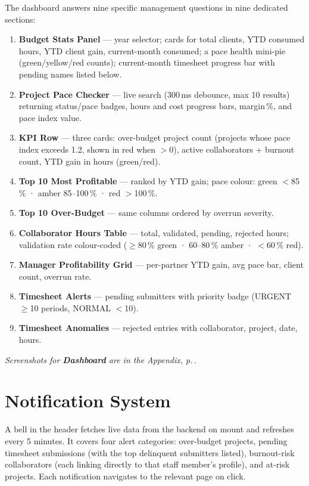 \documentclass[12pt,a4paper]{report}
\newcommand{\annexref}[1]{\begin{screenshotbox}\small\textit{Screenshots for \textbf{#1} are in the Appendix, p.\,\pageref{annex:#1}.}\end{screenshotbox}\vspace{4pt}}
\begin{document}
The dashboard answers nine specific management questions in nine dedicated sections:

\begin{enumerate}[leftmargin=*, label=\arabic*.]
  \item \textbf{Budget Stats Panel} --- year selector; cards for total clients, YTD consumed hours, YTD client gain, current-month consumed; a pace health mini-pie (green/yellow/red counts); current-month timesheet progress bar with pending names listed below.
  \item \textbf{Project Pace Checker} --- live search (300\,ms debounce, max 10 results) returning status/pace badges, hours and cost progress bars, margin\,\%, and pace index value.
  \item \textbf{KPI Row} --- three cards: over-budget project count (projects whose pace index exceeds 1.2, shown in red when $>$0), active collaborators + burnout count, YTD gain in hours (green/red).
  \item \textbf{Top 10 Most Profitable} --- ranked by YTD gain; pace colour: green $<$85\,\% · amber 85--100\,\% · red $>$100\,\%.
  \item \textbf{Top 10 Over-Budget} --- same columns ordered by overrun severity.
  \item \textbf{Collaborator Hours Table} --- total, validated, pending, rejected hours; validation rate colour-coded ($\geq$80\,\% green · 60--80\,\% amber · $<$60\,\% red).
  \item \textbf{Manager Profitability Grid} --- per-partner YTD gain, avg pace bar, client count, overrun rate.
  \item \textbf{Timesheet Alerts} --- pending submitters with priority badge (URGENT $\geq$10 periods, NORMAL $<$10).
  \item \textbf{Timesheet Anomalies} --- rejected entries with collaborator, project, date, hours.
\end{enumerate}

\annexref{Dashboard}

\section{Notification System}

A bell in the header fetches live data from the backend on mount and refreshes
every 5 minutes. It covers four alert categories: over-budget projects, pending
timesheet submissions (with the top delinquent submitters listed), burnout-risk
collaborators (each linking directly to that staff member's profile), and
at-risk projects. Each notification navigates to the relevant page on click.
\end{document}
